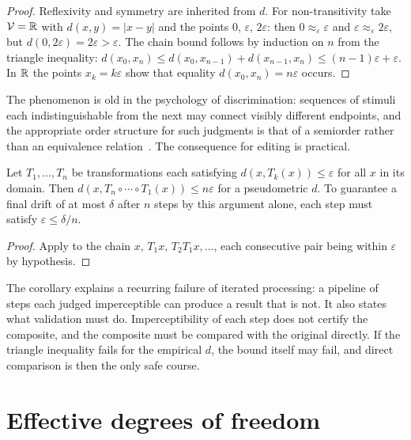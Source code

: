\begin{proof}
Reflexivity and symmetry are inherited from $d$. For non-transitivity take $\mathcal{V}=\mathbb{R}$ with $d(x,y)=\lvert x-y\rvert$ and the points $0$, $\varepsilon$, $2\varepsilon$: then $0\approx_\varepsilon\varepsilon$ and $\varepsilon\approx_\varepsilon2\varepsilon$, but $d(0,2\varepsilon)=2\varepsilon>\varepsilon$. The chain bound follows by induction on $n$ from the triangle inequality: $d(x_0,x_n)\le d(x_0,x_{n-1})+d(x_{n-1},x_n)\le(n-1)\varepsilon+\varepsilon$. In $\mathbb{R}$ the points $x_k=k\varepsilon$ show that equality $d(x_0,x_n)=n\varepsilon$ occurs.
\end{proof}

The phenomenon is old in the psychology of discrimination: sequences of stimuli each indistinguishable from the next may connect visibly different endpoints, and the appropriate order structure for such judgments is that of a semiorder rather than an equivalence relation~\cite{luce1956}. The consequence for editing is practical.

\begin{corollary}\label{cor:drift}
Let $T_1,\dots,T_n$ be transformations each satisfying $d(x,T_k(x))\le\varepsilon$ for all $x$ in its domain. Then $d(x,T_n\circ\cdots\circ T_1(x))\le n\varepsilon$ for a pseudometric $d$. To guarantee a final drift of at most $\delta$ after $n$ steps by this argument alone, each step must satisfy $\varepsilon\le\delta/n$.
\end{corollary}

\begin{proof}
Apply  to the chain $x,\,T_1x,\,T_2T_1x,\dots$, each consecutive pair being within $\varepsilon$ by hypothesis.
\end{proof}

The corollary explains a recurring failure of iterated processing: a pipeline of steps each judged imperceptible can produce a result that is not. It also states what validation must do. Imperceptibility of each step does not certify the composite, and the composite must be compared with the original directly. If the triangle inequality fails for the empirical $d$, the bound itself may fail, and direct comparison is then the only safe course.

\section{Effective degrees of freedom}

